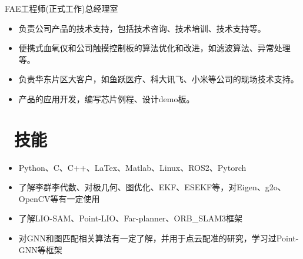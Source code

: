 \documentclass{resume}
\begin{document}
FAE工程师(正式工作)\qquad 总经理室
\begin{itemize}
  \item 负责公司产品的技术支持，包括技术咨询、技术培训、技术支持等。
  \item 便携式血氧仪和公司触摸控制板的算法优化和改进，如滤波算法、异常处理等。
  \item 负责华东片区大客户，如鱼跃医疗、科大讯飞、小米等公司的现场技术支持。
  \item 产品的应用开发，编写芯片例程、设计demo板。
\end{itemize}



\section{\textcolor[RGB]{50,50,190}{\faCogs\ 技能}}
\begin{itemize}[parsep=0.5ex]
  \item Python、C、C++、LaTex、Matlab、Linux、ROS2、Pytorch
  \item 了解李群李代数、对极几何、图优化、EKF、ESEKF等，对Eigen、g2o、OpenCV等有一定使用
  \item 了解LIO-SAM、Point-LIO、Far-planner、ORB\_SLAM3框架
  \item 对GNN和图匹配相关算法有一定了解，并用于点云配准的研究，学习过Point-GNN等框架

\end{itemize}
\end{document}
